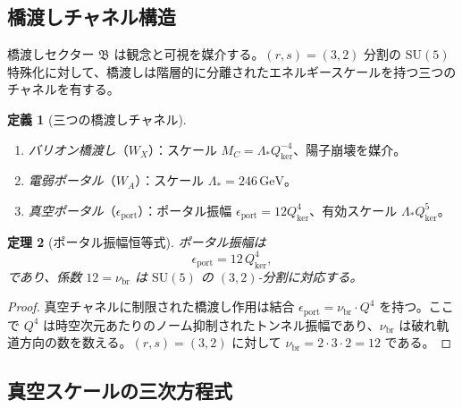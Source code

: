 \documentclass[12pt]{article}
\theoremstyle{plain}
\newtheorem{theorem}{定理}[section]
\theoremstyle{definition}
\newtheorem{definition}[theorem]{定義}
\numberwithin{equation}{section}
\newcommand{\fB}{\mathfrak{B}}
\newcommand{\br}{\mathrm{br}}
\newcommand{\kker}{\mathrm{ker}}
\begin{document}
\subsection{橋渡しチャネル構造}

橋渡しセクター $\fB$ は観念と可視を媒介する。$(r,s)=(3,2)$ 分割の $\mathrm{SU}(5)$ 特殊化に対して、橋渡しは階層的に分離されたエネルギースケールを持つ三つのチャネルを有する。

\begin{definition}[三つの橋渡しチャネル]
\begin{enumerate}[label=(\roman*)]
\item \emph{バリオン橋渡し}（$W_X$）：スケール $M_C=\Lambda_* Q_{\kker}^{-4}$、陽子崩壊を媒介。
\item \emph{電弱ポータル}（$W_A$）：スケール $\Lambda_*=246\,\mathrm{GeV}$。
\item \emph{真空ポータル}（$\epsilon_{\mathrm{port}}$）：ポータル振幅 $\epsilon_{\mathrm{port}}=12Q_{\kker}^4$、有効スケール $\Lambda_* Q_{\kker}^5$。
\end{enumerate}
\end{definition}

\begin{theorem}[ポータル振幅恒等式]\label{thm:portal}
ポータル振幅は
\begin{equation}
\boxed{\epsilon_{\mathrm{port}} = 12\,Q_{\kker}^4,}
\end{equation}
であり、係数 $12=\nu_{\br}$ は $\mathrm{SU}(5)$ の $(3,2)$-分割に対応する。
\end{theorem}

\begin{proof}
真空チャネルに制限された橋渡し作用は結合 $\epsilon_{\mathrm{port}}=\nu_{\br}\cdot Q^4$ を持つ。ここで $Q^4$ は時空次元あたりのノーム抑制されたトンネル振幅であり、$\nu_{\br}$ は破れ軌道方向の数を数える。$(r,s)=(3,2)$ に対して $\nu_{\br}=2\cdot 3\cdot 2=12$ である。
\end{proof}

\subsection{真空スケールの三次方程式}
\end{document}
